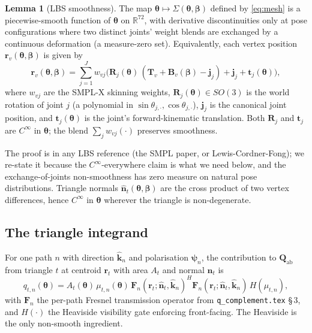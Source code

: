 \documentclass[11pt,a4paper]{article}
\theoremstyle{definition}
\newtheorem{lemma}[lemma]{Lemma}
\newcommand{\khat}{\hat{\bm{k}}}
\newcommand{\nhat}{\hat{\bm{n}}}
\newcommand{\rr}{\mathbf{r}}
\newcommand{\Reals}{\mathbb{R}}
\newcommand{\Qabs}{\mathbf{Q}_{\mathrm{ab}}}
\newcommand{\thetab}{\bm{\theta}}
\newcommand{\betab}{\bm{\beta}}
\begin{document}
\begin{lemma}[LBS smoothness]\label{lem:lbs-smooth}
The map $\thetab\mapsto\Sigma(\thetab,\betab)$ defined by
\eqref{eq:mesh} is a piecewise-smooth function of $\thetab$ on
$\Reals^{72}$, with derivative discontinuities only at pose
configurations where two distinct joints' weight blends are exchanged
by a continuous deformation (a measure-zero set).  Equivalently,
each vertex position $\rr_v(\thetab,\betab)$ is given by
\begin{equation}\label{eq:lbs}
  \rr_v(\thetab,\betab)
  =\sum_{j=1}^{J}w_{vj}\bigl(\mathbf{R}_j(\thetab)\,
                              (\mathbf{T}_v+\mathbf{B}_v(\betab)
                                              -\mathbf{j}_j)
                              +\mathbf{j}_j+\mathbf{t}_j(\thetab)\bigr),
\end{equation}
where $w_{vj}$ are the SMPL-X skinning weights, $\mathbf{R}_j(\thetab)
\in SO(3)$ is the world rotation of joint $j$ (a polynomial in
$\sin\theta_{j,\cdot},\cos\theta_{j,\cdot}$), $\mathbf{j}_j$ is the
canonical joint position, and $\mathbf{t}_j(\thetab)$ is the joint's
forward-kinematic translation.  Both $\mathbf{R}_j$ and
$\mathbf{t}_j$ are $C^\infty$ in $\thetab$; the blend
$\sum_jw_{vj}(\cdot)$ preserves smoothness.
\end{lemma}

\noindent The proof is in any LBS reference (the SMPL paper, or
Lewis-Cordner-Fong); we re-state it because the
$C^\infty$-everywhere claim is what we need below, and the
exchange-of-joints non-smoothness has zero measure on natural pose
distributions.  Triangle normals
$\nhat_t(\thetab,\betab)$ are the cross product of two vertex
differences, hence $C^\infty$ in $\thetab$ wherever the triangle is
non-degenerate.

\subsection{The triangle integrand}

For one path $n$ with direction $\khat_n$ and polarisation
$\bm\psi_n$, the contribution to $\Qabs$ from triangle $t$ at
centroid $\rr_t$ with area $A_t$ and normal $\nhat_t$ is
\begin{equation}\label{eq:int-tri}
  q_{t,n}(\thetab) = A_t(\thetab)\,\mu_{t,n}(\thetab)\,
                     \mathbf{F}_n(\rr_t;\nhat_t,\khat_n)^H
                     \mathbf{F}_n(\rr_t;\nhat_t,\khat_n)\,H(\mu_{t,n}),
\end{equation}
with $\mathbf{F}_n$ the per-path Fresnel transmission operator from
\texttt{q\_complement.tex} \S\,3, and $H(\cdot)$ the Heaviside
visibility gate enforcing front-facing.  The Heaviside is the only
non-smooth ingredient.
\end{document}
